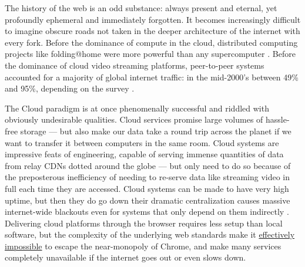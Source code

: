 The history of the web is an odd substance: always present and eternal,
yet profoundly ephemeral and immediately forgotten. It becomes
increasingly difficult to imagine obscure roads not taken in the deeper
architecture of the internet with every fork. Before the
dominance of compute in the cloud, distributed computing projects like
folding@home were more powerful than any supercomputer \cite{v.FileFoldingHome2012} . Before the dominance of cloud video
streaming platforms, peer-to-peer systems accounted for a majority of
global internet traffic: in the mid-2000's between 49\% and 95\%,
depending on the survey \cite{vandersarBitTorrentOneThird2006, vandersarP2PTrafficBooming2007} .

The Cloud paradigm is at once phenomenally successful and riddled with
obviously undesirable qualities. Cloud services promise large volumes of
hassle-free storage --- but also make our data take a round trip across
the planet if we want to transfer it between computers in the same room.
Cloud systems are impressive feats of engineering, capable of serving
immense quantities of data from relay CDNs dotted around the globe ---
but only need to do so because of the preposterous inefficiency of
needing to re-serve data like streaming video in full each time they are
accessed. Cloud systems can be made to have very high uptime, but then
they do go down their dramatic centralization causes massive
internet-wide blackouts even for systems that only depend on them
indirectly \cite{lawlerAmazonServerOutage2021, hutchinsonAmazonWebServices2012} . Delivering cloud platforms through
the browser requires less setup than local software, but the complexity
of the underlying web standards make it
\href{https://drewdevault.com/2020/03/18/Reckless-limitless-scope.html}{effectively
impossible} \cite{devaultRecklessInfiniteScope2020}  to escape
the near-monopoly of
Chrome, and make many services completely
unavailable if the internet goes out or even slows down.

